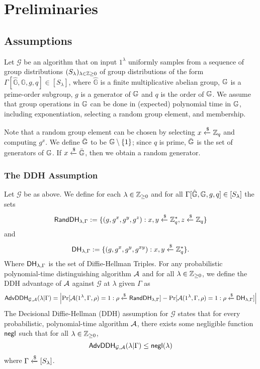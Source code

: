 \section{Preliminaries}

\subsection{Assumptions}

Let $\mathcal{G}$ be an algorithm that on input $1^\lambda$ uniformly samples from a sequence of group distributions $(S_\lambda)_{\lambda\in\mathbb{Z}\geq 0}$ of group distributions of the form $\Gamma[\hat{\mathbb{G}}, \mathbb{G}, g, q]\in[S_\lambda]$, where $\hat{\mathbb{G}}$ is a finite multiplicative abelian group, $\mathbb{G}$ is a prime-order subgroup, $g$ is a generator of $\mathbb{G}$ and $q$ is the order of $\mathbb{G}$. We assume that group operations in $\mathbb{G}$ can be done in (expected) polynomial time in $\mathbb{G}$, including exponentiation, selecting a random group element, and membership. 

Note that a random group element can be chosen by selecting $x\xleftarrow{\$}\mathbb{Z}_q$ and computing $g^x$. We define $\bar{\mathbb{G}}$ to be $\mathbb{G}\setminus\{1\}$; since $q$ is prime, $\bar{\mathbb{G}}$ is the set of generators of $\mathbb{G}$. If $x\xleftarrow{\$}\bar{\mathbb{G}}$, then we obtain a random generator.

\subsubsection{The DDH Assumption}

Let $\mathcal{G}$ be as above. We define for each $\lambda\in\mathbb{Z}_{\geq 0}$ and for all $\Gamma[\hat{\mathbb{G}}, \mathbb{G}, g, q]\in[S_\lambda]$ the sets 
\begin{equation*}
	\mathsf{RandDH}_{\lambda,\Gamma} := \{(g, g^x, g^y, g^{z}) : x,y\xleftarrow{\$}\mathbb{Z}_q^{*}, z\xleftarrow{\$}\mathbb{Z}_q\}
\end{equation*}
and
\begin{equation*}
	\mathsf{DH}_{\lambda,\Gamma} := \{(g, g^x, g^y, g^{xy}) : x,y\xleftarrow{\$}\mathbb{Z}_q^{*}\}.
\end{equation*}
Where $\mathsf{DH}_{\lambda,\Gamma}$ is the set of Diffie-Hellman Triples. For any probabilistic polynomial-time distinguishing algorithm $\mathcal{A}$ and for all $\lambda\in\mathbb{Z}_{\geq 0}$, we define the DDH advantage of $\mathcal{A}$ against $\mathcal{G}$ at $\lambda$ given $\Gamma$ as
\begin{equation*}
	\mathsf{AdvDDH}_{\mathcal{G},\mathcal{A}}(\lambda | \Gamma) = \left|\Pr[\mathcal{A}(1^\lambda,\Gamma,\rho) = 1 : \rho\xleftarrow{\$}\mathsf{RandDH}_{\lambda,\Gamma}] - \Pr[\mathcal{A}(1^\lambda,\Gamma,\rho) = 1 : \rho\xleftarrow{\$}\mathsf{DH}_{\lambda,\Gamma}]\right|
\end{equation*}
The Decisional Diffie-Hellman (DDH) assumption for $\mathcal{G}$ states that for every probabilistic, polynomial-time algorithm $\mathcal{A}$, there exists some negligible function $\mathsf{negl}$ such that for all $\lambda\in\mathbb{Z}_{\geq 0}$, $$\mathsf{AdvDDH}_{\mathcal{G},\mathcal{A}}(\lambda | \Gamma)\leq\mathsf{negl}(\lambda)$$ where $\Gamma\xleftarrow{\$}[S_\lambda]$.


